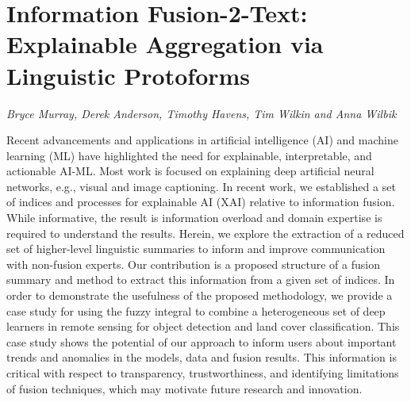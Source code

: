 \documentclass[../booklet.tex]{subfiles}
\begin{document}
\section[Information Fusion-2-Text: Explainable Aggregation via Linguistic Protoforms. {\it Bryce Murray, Derek Anderson, Timothy Havens, Tim Wilkin and Anna Wilbik}]{Information Fusion-2-Text: Explainable Aggregation via Linguistic Protoforms}
    

\begin{center}
  {\it Bryce Murray, Derek Anderson, Timothy Havens, Tim Wilkin and Anna Wilbik}
\end{center}

\vskip 0.8cm



Recent advancements and applications in artificial intelligence (AI) and machine learning (ML) have highlighted the need for explainable, interpretable, and actionable AI-ML. Most work is focused on explaining deep artificial neural networks, e.g., visual and image captioning. In recent work, we established a set of indices and processes for explainable AI (XAI) relative to information fusion. While informative, the result is information overload and domain expertise is required to understand the results. Herein, we explore the extraction of a reduced set of higher-level linguistic summaries to inform and improve communication with non-fusion experts. Our contribution is a proposed structure of a fusion summary and method to extract this information from a given set of indices. In order to demonstrate the usefulness of the proposed methodology, we provide a case study for using the fuzzy integral to combine a heterogeneous set of deep learners in remote sensing for object detection and land cover classification.
This case study shows the potential of our approach to inform users about important trends and anomalies in the models, data and fusion results. This information is critical with respect to transparency, trustworthiness, and identifying limitations of fusion techniques, which may motivate future research and innovation.

\end{document}
